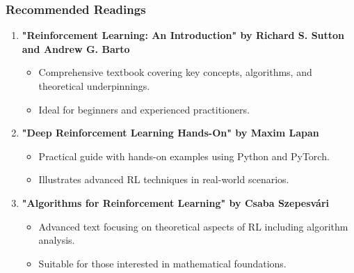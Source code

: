 \documentclass[aspectratio=169]{beamer}
\begin{document}
\begin{frame}[fragile]
    \frametitle{Recommended Readings}
    \begin{enumerate}
        \item \textbf{"Reinforcement Learning: An Introduction" by Richard S. Sutton and Andrew G. Barto}
        \begin{itemize}
            \item Comprehensive textbook covering key concepts, algorithms, and theoretical underpinnings.
            \item Ideal for beginners and experienced practitioners.
        \end{itemize}
        
        \item \textbf{"Deep Reinforcement Learning Hands-On" by Maxim Lapan}
        \begin{itemize}
            \item Practical guide with hands-on examples using Python and PyTorch.
            \item Illustrates advanced RL techniques in real-world scenarios.
        \end{itemize}
        
        \item \textbf{"Algorithms for Reinforcement Learning" by Csaba Szepesvári}
        \begin{itemize}
            \item Advanced text focusing on theoretical aspects of RL including algorithm analysis.
            \item Suitable for those interested in mathematical foundations.
        \end{itemize}
    \end{enumerate}
\end{frame}
\end{document}
